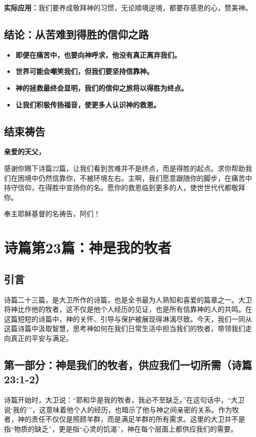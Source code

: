 \documentclass[a4paper, 12pt]{article}
\begin{document}
\textbf{实际应用：}我们要养成敬拜神的习惯，无论顺境逆境，都要存感恩的心，赞美神。

\subsection*{结论：从苦难到得胜的信仰之路}

\begin{itemize}
    \item \textbf{即便在痛苦中，也要向神呼求，他没有真正离弃我们。}
    \item \textbf{世界可能会嘲笑我们，但我们要坚持信靠神。}
    \item \textbf{神的拯救最终会显明，我们的信仰之旅将以得胜为终点。}
    \item \textbf{让我们积极传扬福音，使更多人认识神的救恩。}
\end{itemize}

\subsection*{结束祷告}

\textbf{亲爱的天父，}

感谢你赐下诗篇22篇，让我们看到苦难并不是终点，而是得胜的起点。求你帮助我们在困境中仍然信靠你，不被环境左右。主啊，我们愿意跟随你的脚步，在痛苦中持守信仰，在得胜中宣扬你的名。愿你的救恩临到更多的人，使世世代代都敬拜你。

奉主耶稣基督的名祷告，阿们！
\newpage
\section{诗篇第23篇：神是我的牧者}
\subsection*{引言}
\hspace{0.6cm}诗篇二十三篇，是大卫所作的诗篇，也是全书最为人熟知和喜爱的篇章之一。大卫将神比作他的牧者，这不仅是他个人经历的见证，也是所有信靠神的人的共鸣。在这篇短短的诗篇中，神的关怀、引导与保护被展现得淋漓尽致。今天，我们一同从这篇诗篇中汲取智慧，思考神如何在我们日常生活中担当我们的牧者，带领我们走向真正的平安与满足。
\subsection*{第一部分：神是我们的牧者，供应我们一切所需（诗篇 23:1-2）}
\hspace{0.6cm}诗篇开始时，大卫说：“耶和华是我的牧者，我必不至缺乏。”在这句话中，“大卫说‘我的’”，这意味着他个人的经历，也暗示了他与神之间亲密的关系。作为牧者，神的责任不仅仅是照顾羊群，而是满足羊群的所有需求。这里的大卫并不是指“物质的缺乏”，更是指“心灵的饥渴”，神在每个层面上都供应我们的需要。
\end{document}
